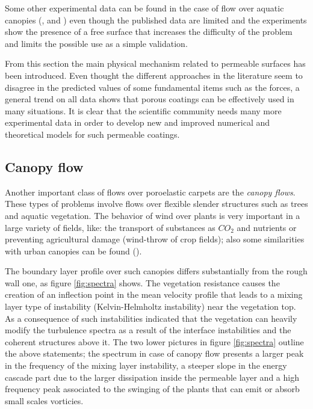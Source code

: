 Some other experimental data can be found in the case of flow over aquatic canopies (\citet{zhang2011exchange}, \citet{segalini2011experimental} and \citet{hamed2017impact}) even though the published data are limited and the experiments show the presence of a free surface that increases the difficulty of the problem and limits the possible use as a simple validation.

From this section the main physical mechanism related to permeable surfaces has been introduced.
Even thought the different approaches in the literature seem to disagree in the predicted values of some fundamental items such as the forces, a general trend on all  data shows that porous coatings can be effectively used in many situations.
It is clear that the scientific community needs many more experimental data in order to develop new and improved numerical and theoretical models for such permeable coatings.

\subsection{Canopy flow}

Another important class of flows over poroelastic carpets are the \textit{canopy flows}.
These types of problems involve flows over flexible slender structures such as trees and aquatic vegetation.
The behavior of wind over plants is very important in a large variety of fields, like: the transport of substances as $CO_2$ and nutrients or preventing agricultural damage (wind-throw of crop fields); also some similarities with urban canopies can be found (\citet{ghisalberti2009obstructed}).

The boundary layer profile over such canopies differs substantially from the rough wall one, as figure \ref{fig:spectra} shows.
The vegetation resistance causes the creation of an inflection point in the mean velocity profile that leads to a mixing layer type of instability (Kelvin-Helmholtz instability) near the vegetation top.
As a consequence of such instabilities \citet{finnigan2000turbulence} indicated that the vegetation can heavily modify the turbulence spectra as a result of the interface instabilities and the coherent structures above it.
The two lower pictures in figure \ref{fig:spectra} outline the above statements; the spectrum in case of canopy flow presents a larger peak in the frequency of the mixing layer instability, a steeper slope in the energy cascade part due to the larger dissipation inside the permeable layer and a high frequency peak associated to the swinging of the plants that can emit or absorb small scales vorticies.
 
